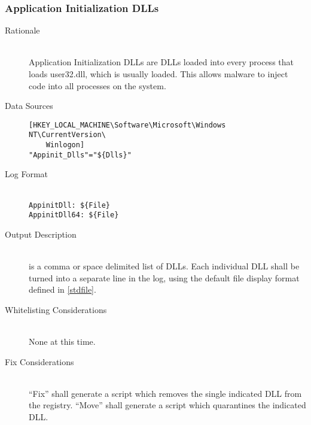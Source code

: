 \subsubsection{Application Initialization DLLs}
\begin{description}
\item[Rationale] \hfill \\
Application Initialization DLLs are DLLs loaded into every process that loads
user32.dll, which is usually loaded. This allows malware to inject code into all
processes on the system.
\item[Data Sources] \hfill
\vspace{-\baselineskip}
\begin{verbatim}
[HKEY_LOCAL_MACHINE\Software\Microsoft\Windows NT\CurrentVersion\
    Winlogon]
"Appinit_Dlls"="${Dlls}"
\end{verbatim}
\item[Log Format] \hfill \\
\verb|AppinitDll: ${File}| \\
\verb|AppinitDll64: ${File}|
\item[Output Description] \hfill \\
 is a comma or space delimited list of DLLs. Each individual DLL shall
be turned into a separate line in the log, using the default file display format
defined in \ref{stdfile}.
\item[Whitelisting Considerations] \hfill \\
None at this time.
\item[Fix Considerations] \hfill \\
``Fix'' shall generate a script which removes the single indicated DLL from the
registry. ``Move'' shall generate a script which quarantines the indicated DLL.
\end{description}

